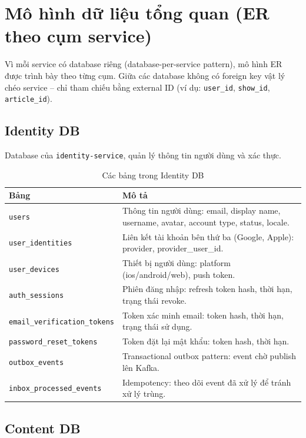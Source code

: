 \documentclass[14pt,a4paper,oneside]{extreport}
\begin{document}
\section{Mô hình dữ liệu tổng quan (ER theo cụm service)}
\label{sec:er-tong-quan}

Vì mỗi service có database riêng (database-per-service pattern), mô hình ER được trình bày theo từng cụm. Giữa các database không có foreign key vật lý chéo service -- chỉ tham chiếu bằng external ID (ví dụ: \texttt{user\_id}, \texttt{show\_id}, \texttt{article\_id}).

\subsection{Identity DB}

Database của \texttt{identity-service}, quản lý thông tin người dùng và xác thực.

\begin{table}[H]
\centering
\caption{Các bảng trong Identity DB}
\label{tab:er-identity}
\renewcommand{\arraystretch}{1.3}
\small
\begin{tabularx}{\textwidth}{|l|X|}
\hline
\textbf{Bảng} & \textbf{Mô tả} \\
\hline
\texttt{users} & Thông tin người dùng: email, display name, username, avatar, account type, status, locale. \\
\hline
\texttt{user\_identities} & Liên kết tài khoản bên thứ ba (Google, Apple): provider, provider\_user\_id. \\
\hline
\texttt{user\_devices} & Thiết bị người dùng: platform (ios/android/web), push token. \\
\hline
\texttt{auth\_sessions} & Phiên đăng nhập: refresh token hash, thời hạn, trạng thái revoke. \\
\hline
\texttt{email\_verification\_tokens} & Token xác minh email: token hash, thời hạn, trạng thái sử dụng. \\
\hline
\texttt{password\_reset\_tokens} & Token đặt lại mật khẩu: token hash, thời hạn. \\
\hline
\texttt{outbox\_events} & Transactional outbox pattern: event chờ publish lên Kafka. \\
\hline
\texttt{inbox\_processed\_events} & Idempotency: theo dõi event đã xử lý để tránh xử lý trùng. \\
\hline
\end{tabularx}
\end{table}

\subsection{Content DB}
\end{document}
